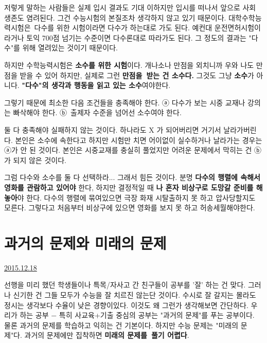 저렇게 말하는 사람들은 실제 입시 결과도 기대 이하지만 입시를 떠나서 앞으로 사회 생존도 염려된다.
그건 수능시험의 본질조차 생각하지 않고 있기 때문이다.
대학수학능력시험은 다수를 위한 시험이라면 다수가 하는대로 가도 된다.
예컨대 운전면허시험이라거나 토익 700점 넘기는 수준이면 다수론대로 따라가도 된다.
그 정도의 결과는 "다수"를 위해 열려있는 것이기 때문이다.
\vspace{5mm}

하지만 수학능력시험은 \textbf{소수를 위한 시험}이다.
개나소나 만점을 외치니까 우와 나도 만점을 받을 수 있어 하지만, 실제로 그런 \textbf{만점을 받는 건 소수다.}
그것도 그냥 \textbf{소수}가 아니다. \textbf{"\textbf{다수}"의 생각과 행동을 읽고 있는 \textbf{소수}}여야한다.
\vspace{5mm}

그렇기 때문에 최소한 다음 조건들을 충족해야 한다.
ⓐ 다수가 보는 시중 교재나 강의는 빠삭해야 한다.
ⓑ 출제자 수준을 넘어선 소수여야 한다.
\vspace{5mm}

둘 다 충족해야 실패하지 않는 것이다. 하나라도 X 가 되어버리면 거기서 날라가버린다.
본인은 소수에 속한다고 하지만 시험만 치면 어이없이 실수하거나 날라가는 경우는 ⓐ가 안 된 것이다.
본인은 시중교재를 충실히 풀었지만 어려운 문제에서 막히는 건 ⓑ가 되지 않은 것이다.
\vspace{5mm}

그럼 다수와 소수를 둘 다 선택하라... 그래서 힘든 것이다.
분명 \textbf{다수의 행렬에 속해서 영화를 관람하고 있어야} 한다,
하지만 결정적일 때 \textbf{나 혼자 비상구로 도망갈 준비를 해놓아}야 한다.
다수의 행렬에 묶여있으면 극장 화재 시탈출하지 못 하고 압사당할지도 모른다.
그렇다고 처음부터 비상구에 있으면 영화를 보지 못 하고 허송세월해야한다.








\section{과거의 문제와 미래의 문제}
\href{https://www.kockoc.com/Apoc/551104}{2015.12.18}

\vspace{5mm}

선행을 미리 했던 학생들이나 특목/자사고 간 친구들이 공부를 '잘' 하는 건 맞다.
그러나 신기한 건 그들 모두가 수능을 잘 치르진 않는단 것이다. 수시로 잘 갈지는 몰라도 정시는 생각보다 수율이 낮은 경향이있다.
이것도 왜 그런가 생각해보면 간단하다.
우리가 하는 공부 $-$ 특히 사교육+기출 중심의 공부는 "과거의 문제"를 푸는 공부이다.
물론 과거의 문제를 학습하고 익히는 건 기본이다. 하지만 수능 문제는 "미래의 문제"다.
과거의 문제에만 집착하면 \textbf{미래의 문제를 풀기 어렵다}.
\vspace{5mm}


